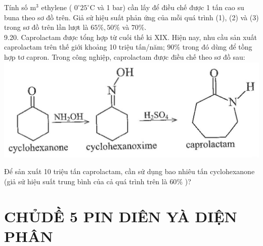 \documentclass[10pt]{article}
\begin{document}
Tính số $\mathrm{m}^{3}$ ethylene ( $0^{\circ} 25^{\circ} \mathrm{C}$ và 1 bar) cần lấy để điều chế được 1 tấn cao su buna theo sơ đồ trên. Giả sử hiệu suất phản ứng của mỗi quá trình (1), (2) và (3) trong sơ đồ trên lần lượt là $65 \%, 50 \%$ và $70 \%$.\\
9.20. Caprolactam được tổng hợp từ cuối thế ki XIX. Hiện nay, nhu cầu sản xuất caprolactam trên thế giới khoảng 10 triệu tấn/năm; $90 \%$ trong đó dùng để tồng hợp tơ capron. Trong công nghiệp, caprolactam được điều chế theo sơ đồ sau:\\
\includegraphics[max width=\textwidth, center]{2025_10_23_80c1361fcdcd395cad8eg-32}

Để sản xuất 10 triệu tấn caprolactam, cần sử dụng bao nhiêu tấn cyclohexanone (giả sử hiệu suất trung bình của cả quá trình trên là $60 \%$ )?

\section*{CHỦDỀ 5 PIN DIÊN YÀ DIỆN PHÂN}
\end{document}
